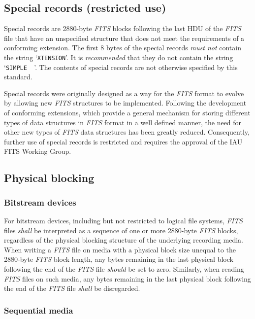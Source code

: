 \documentclass[onecolumn]{aa}
\begin{document}
  \subsection{Special records (restricted use)}
   Special records are 2880-byte {\em FITS\/} blocks following the last HDU
   of the {\em FITS\/} file that have an unspecified structure that does not
   meet the requirements of a conforming extension. The first 8
   bytes of the special records {\em must not} contain the
   string `\verb+XTENSION+'.  It is {\em recommended} that they
   do not contain the string  
   `\verb*+SIMPLE  +'. The contents of special records are not otherwise 
   specified by this standard.  

   Special records were originally designed as a way for the {\em FITS\/}
   format to evolve by allowing new {\em FITS\/} structures to be implemented.  
   Following the development of conforming extensions, which provide a general
   mechanism for storing different types of data structures in {\em FITS\/} format in
   a well defined manner, the need for other new types of {\em FITS\/} data
   structures has been greatly reduced.  Consequently, further use of special
   records is restricted and requires the approval of the IAU FITS Working 
   Group.

   \subsection{Physical blocking}
   \label{s:PhysBlk}  
    \subsubsection{Bitstream devices}     
     \label{s:BitDev}
For bitstream devices, including but not restricted to  logical file systems, 
{\em FITS\/} files {\em shall} be interpreted as a sequence  of one or more 2880-byte
{\em FITS\/} blocks, regardless of the physical blocking structure of the
underlying recording media.  When writing a {\em FITS\/} file on  media with a
physical block size unequal to the 2880-byte {\em FITS\/} block  length, any
bytes remaining in the last physical block following  the end of the {\em
FITS\/} file {\em should} be set to zero.  Similarly, when reading  {\em FITS\/}
files on such media, any bytes remaining in the last physical block following 
the end of the {\em FITS\/} file {\em shall} be disregarded. 

    \subsubsection{Sequential media}
\end{document}
